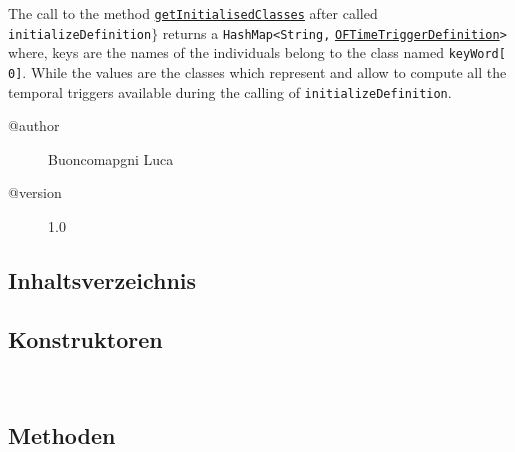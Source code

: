  The call to the method \texttt{\hyperlink{ontologyFramework.OFEventManagement.OFTimeTriggerManagement.OFTimeTriggerBuilder.getInitialisedClasses()}{getInitialisedClasses}} after called \texttt{initializeDefinition}$\}$
 returns a \verb!HashMap<String,! \texttt{\hyperlink{ontologyFramework.OFEventManagement.OFTimeTriggerManagement.OFTimeTriggerDefinition-class}{OFTimeTriggerDefinition}}\verb!>! where, keys are the names of the individuals
 belong to the class named \verb!keyWord[ 0]!. While the values are the classes which represent and
 allow to compute all the temporal triggers available during the calling of \texttt{initializeDefinition}.
\begin{description}
\item[@author] 
Buoncomapgni Luca
\item[@version] 
1.0
\end{description}
\subsection{Inhaltsverzeichnis}
\subsection{Konstruktoren}
\begin{description}
\item[{\label{ontologyFramework.OFEventManagement.OFTimeTriggerManagement.OFTimeTriggerBuilder()}}]
~ 
\end{description}
\subsection{Methoden}
\begin{description}
\item[{\label{ontologyFramework.OFEventManagement.OFTimeTriggerManagement.OFTimeTriggerBuilder.buildInfo(java.lang.String[],ontologyFramework.OFContextManagement.OWLReferences,ontologyFramework.OFRunning.OFInvokingManager.OFBuildedListInvoker)}}]
~ 
\item[{\label{ontologyFramework.OFEventManagement.OFTimeTriggerManagement.OFTimeTriggerBuilder.getInitialisedClasses()}}]
~ 
\end{description}
